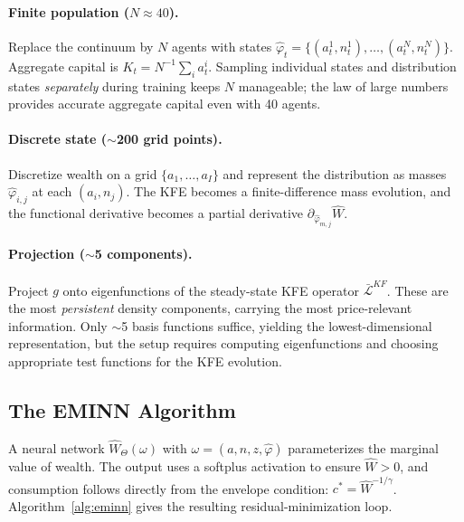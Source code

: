 \documentclass[11pt,a4paper]{report}
\begin{document}
\paragraph{Finite population ($N \approx 40$).}  Replace the continuum by $N$ agents with states $\hat{\varphi}_t = \{(a_t^1, n_t^1),\ldots,(a_t^N,n_t^N)\}$.  Aggregate capital is $K_t = N^{-1}\sum_i a_t^i$.  Sampling individual states and distribution states \emph{separately} during training keeps $N$ manageable; the law of large numbers provides accurate aggregate capital even with 40 agents.

\paragraph{Discrete state ($\sim$200 grid points).}  Discretize wealth on a grid $\{a_1,\ldots,a_I\}$ and represent the distribution as masses $\hat{\varphi}_{i,j}$ at each $(a_i, n_j)$.  The KFE becomes a finite-difference mass evolution, and the functional derivative becomes a partial derivative $\partial_{\hat{\varphi}_{m,j}}\hat{W}$.

\paragraph{Projection ($\sim$5 components).}  Project $g$ onto eigenfunctions of the steady-state KFE operator $\bar{\mathcal{L}}^{KF}$.  These are the most \emph{persistent} density components, carrying the most price-relevant information.  Only $\sim$5 basis functions suffice, yielding the lowest-dimensional representation, but the setup requires computing eigenfunctions and choosing appropriate test functions for the KFE evolution.

\subsection{The EMINN Algorithm}

A neural network $\hat{W}_\Theta(\omega)$ with $\omega = (a, n, z, \hat{\varphi})$ parameterizes the marginal value of wealth.  The output uses a softplus activation to ensure $\hat{W} > 0$, and consumption follows directly from the envelope condition: $c^* = \hat{W}^{-1/\gamma}$.  Algorithm~\ref{alg:eminn} gives the resulting residual-minimization loop.
\end{document}
